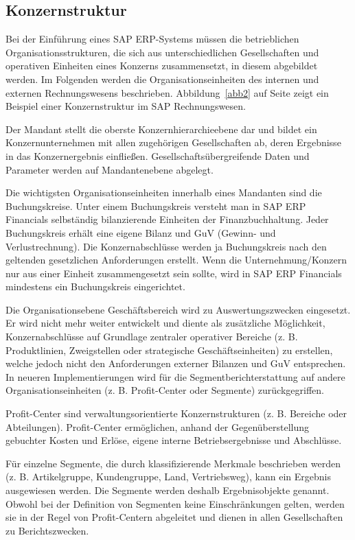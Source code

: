 \subsection{Konzernstruktur}
Bei der Einführung eines SAP ERP-Systems müssen die betrieblichen Organisationsstrukturen, die sich aus unterschiedlichen Gesellschaften und operativen Einheiten eines Konzerns zusammensetzt, in diesem abgebildet werden.
Im Folgenden werden die Organisationseinheiten des internen und externen Rechnungswesens beschrieben. Abbildung~\ref{abb2} auf Seite \pageref{abb2} zeigt ein Beispiel einer Konzernstruktur im SAP Rechnungswesen.

Der Mandant stellt die oberste Konzernhierarchieebene dar und bildet ein Konzernunternehmen mit allen zugehörigen Gesellschaften ab, deren Ergebnisse in das Konzernergebnis einfließen. Gesellschaftsübergreifende Daten und Parameter werden auf Mandantenebene abgelegt.

Die wichtigsten Organisationseinheiten innerhalb eines Mandanten sind die Buchungskreise. Unter einem Buchungskreis versteht man in SAP ERP Financials selbständig bilanzierende Einheiten der Finanzbuchhaltung. Jeder Buchungskreis erhält eine eigene Bilanz und GuV (Gewinn- und Verlustrechnung). Die Konzernabschlüsse werden ja Buchungskreis nach den geltenden gesetzlichen Anforderungen erstellt. Wenn die Unternehmung/Konzern nur aus einer Einheit zusammengesetzt sein sollte, wird in SAP ERP Financials mindestens ein Buchungskreis eingerichtet.

Die Organisationsebene Geschäftsbereich wird zu Auswertungszwecken eingesetzt. Er wird nicht mehr weiter entwickelt und diente als zusätzliche Möglichkeit, Konzernabschlüsse auf Grundlage zentraler operativer Bereiche (z. B. Produktlinien, Zweigstellen oder strategische Geschäftseinheiten) zu erstellen, welche jedoch nicht den Anforderungen externer Bilanzen und GuV entsprechen. In neueren Implementierungen wird für die Segmentberichterstattung auf andere Organisationseinheiten (z. B. Profit-Center oder Segmente) zurückgegriffen.

Profit-Center sind verwaltungsorientierte Konzernstrukturen (z. B. Bereiche oder Abteilungen). Profit-Center ermöglichen, anhand der Gegenüberstellung gebuchter Kosten und Erlöse, eigene interne Betriebsergebnisse und Abschlüsse.

Für einzelne Segmente, die durch klassifizierende Merkmale beschrieben werden (z. B. Artikelgruppe, Kundengruppe, Land, Vertriebsweg), kann ein Ergebnis ausgewiesen werden. Die Segmente werden deshalb Ergebnisobjekte genannt. Obwohl bei der Definition von Segmenten keine Einschränkungen gelten, werden sie in der Regel von Profit-Centern abgeleitet und dienen in allen Gesellschaften zu Berichtszwecken. 

